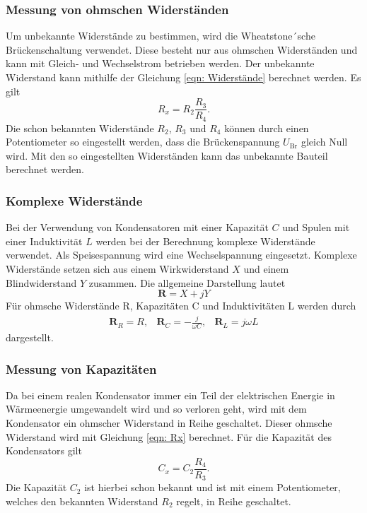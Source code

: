     \subsubsection{Messung von ohmschen Widerständen}

        Um unbekannte Widerstände zu bestimmen, wird die Wheatstone´sche Brückenschaltung verwendet.
        Diese besteht nur aus ohmschen Widerständen und kann mit Gleich- und Wechselstrom betrieben werden.
        Der unbekannte Widerstand kann mithilfe der Gleichung \eqref{eqn: Widerstände} berechnet werden.
        Es gilt
        \begin{equation}
            R_x = R_2 \frac{R_3}{R_4} . \label{eqn: Rx}
        \end{equation}
        Die schon bekannten Widerstände $R_2$, $R_3$ und $R_4$ können durch einen Potentiometer so eingestellt werden,
        dass die Brückenspannung $U_\text{Br}$ gleich Null wird. 
        Mit den so eingestellten Widerständen kann das unbekannte Bauteil berechnet werden.

    \subsubsection{Komplexe Widerstände}

        Bei der Verwendung von Kondensatoren mit einer Kapazität $C$ und Spulen mit einer Induktivität $L$ werden bei der Berechnung
        komplexe Widerstände verwendet. Als Speisespannung wird eine Wechselspannung eingesetzt.
        Komplexe Widerstände setzen sich aus einem Wirkwiderstand $X$ und einem Blindwiderstand $Y$ zusammen.
        Die allgemeine Darstellung lautet
        \begin{equation}
            \symbf{R} = X + jY
        \end{equation}
        Für ohmsche Widerstände R, Kapazitäten C und Induktivitäten L werden durch
        \begin{align}
            \symbf{R}_R = R, & \symbf{R}_C = - \frac{j}{\omega C}, & \symbf{R}_L = j \omega L %
        \end{align}
        dargestellt.
    
    \subsubsection{Messung von Kapazitäten}

        Da bei einem realen Kondensator immer ein Teil der elektrischen Energie in Wärmeenergie umgewandelt
        wird und so verloren geht, wird mit dem Kondensator ein ohmscher Widerstand in Reihe geschaltet.
        Dieser ohmsche Widerstand wird mit Gleichung \eqref{eqn: Rx} berechnet.
        Für die Kapazität des Kondensators gilt
        \begin{equation}
            C_x = C_2 \frac{R_4}{R_3} .
        \end{equation}
        Die Kapazität $C_2$ ist hierbei schon bekannt und ist mit einem Potentiometer, welches den bekannten Widerstand $R_2$ regelt, 
        in Reihe geschaltet.
    
